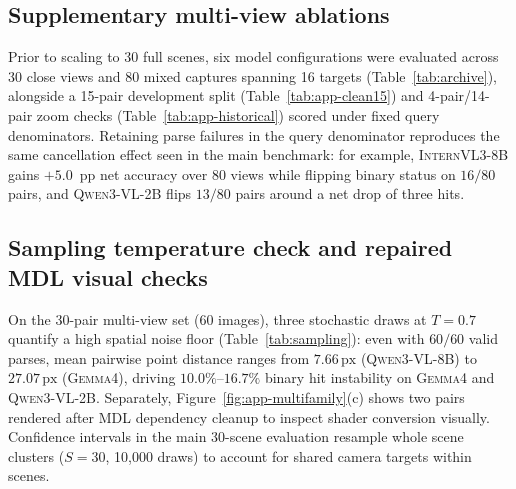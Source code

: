 \subsection{Supplementary multi-view ablations}
Prior to scaling to 30 full scenes, six model configurations were evaluated across 30 close views and 80 mixed captures spanning 16 targets (Table~\ref{tab:archive}), alongside a 15-pair development split (Table~\ref{tab:app-clean15}) and 4-pair/14-pair zoom checks (Table~\ref{tab:app-historical}) scored under fixed query denominators. Retaining parse failures in the query denominator reproduces the same cancellation effect seen in the main benchmark: for example, \textsc{InternVL3-8B} gains $+5.0$~pp net accuracy over 80 views while flipping binary status on $16/80$ pairs, and \textsc{Qwen3-VL-2B} flips $13/80$ pairs around a net drop of three hits.

\begin{table}[!htbp]
\centering\small
\setlength{\tabcolsep}{3pt}
\resizebox{\linewidth}{!}{}
\caption{Supplementary raster readout ablation: end-to-end point hits (\%) under \original{} then \converted{}, retaining every query in the denominator.}
\label{tab:archive}
\end{table}

\begin{table}[!htbp]
\centering\small
\resizebox{\linewidth}{!}{}
\caption{15-pair development split under normalized two-line readout ($V$ parsed outputs, $H$ hits out of $N=15$).}
\label{tab:app-clean15}
\end{table}

\subsection{Sampling temperature check and repaired MDL visual checks}
On the 30-pair multi-view set ($60$ images), three stochastic draws at $T{=}0.7$ quantify a high spatial noise floor (Table~\ref{tab:sampling}): even with $60/60$ valid parses, mean pairwise point distance ranges from $7.66\,\mathrm{px}$ (\textsc{Qwen3-VL-8B}) to $27.07\,\mathrm{px}$ (\textsc{Gemma4}), driving $10.0\%\text{--}16.7\%$ binary hit instability on \textsc{Gemma4} and \textsc{Qwen3-VL-2B}. Separately, Figure~\ref{fig:app-multifamily}(c) shows two pairs rendered after \textsc{MDL} dependency cleanup to inspect shader conversion visually. Confidence intervals in the main 30-scene evaluation resample whole scene clusters ($S{=}30$, 10,000 draws) to account for shared camera targets within scenes.

\begin{table}[!htbp]
\centering\small
\setlength{\tabcolsep}{4pt}
\resizebox{\linewidth}{!}{}
\caption{Pilot (4-pair) and zoom (14-pair) development runs rescored with fixed denominators (\original{}/\converted{}).}
\label{tab:app-historical}
\end{table}

\begin{table}[!htbp]
\centering\small
\resizebox{\linewidth}{!}{}
\caption{Early stochastic decoding check ($T{=}0.7$, three draws per image across 60 archive views).}
\label{tab:sampling}
\end{table}
